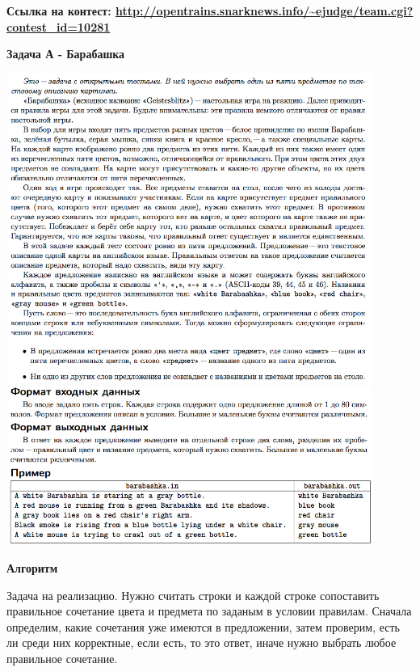 \documentclass[a4paper,12pt]{article}
\begin{document}
\textbf{{\large Ссылка на контест: \url{http://opentrains.snarknews.info/~ejudge/team.cgi?contest_id=10281}}}

\newpage
\textbf{{\large Задача А - Барабашка}}

\begin{center}
\includegraphics[width=0.9\textwidth]{OC_SPB/OC_SPB_A1.png}\\ [1cm]
\includegraphics[width=0.9\textwidth]{OC_SPB/OC_SPB_A2.png}\\ [1cm]
\end{center}
\newpage

\textbf{{\large Алгоритм}}

Задача на реализацию. Нужно считать строки и каждой строке сопоставить правильное сочетание цвета и предмета по заданым в условии правилам. Сначала определим, какие сочетания уже имеются в предложении, затем проверим, есть ли среди них корректные, если есть, то это ответ, иначе нужно выбрать любое правильное сочетание. \\
\end{document}
